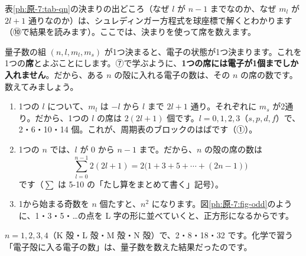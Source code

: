 \noindent 表\ref{ph:原-7:tab-qn}の決まりの出どころ（なぜ $l$ が $n-1$ までなのか、なぜ $m_l$ が $2l+1$ 通りなのか）は、シュレディンガー方程式を球座標で解くとわかります（⑩で結果を読みます）。ここでは、決まりを使って席を数えます。

量子数の組 $(n,l,m_l,m_s)$ が1つ決まると、電子の状態が1つ決まります。これを1つの\textbf{席}とよぶことにします。⑦で学ぶように、\textbf{1つの席には電子が1個までしか入れません}。だから、ある $n$ の殻に入れる電子の数は、その $n$ の席の数です。数えてみましょう。

\begin{enumerate}[label={\bkcircled{\arabic*}}, leftmargin=2.4\zw, itemsep=1pt, topsep=2pt]
\item 1つの $l$ について、$m_l$ は $-l$ から $l$ まで $2l+1$ 通り。それぞれに $m_s$ が2通り。だから、1つの $l$ の席は $2(2l+1)$ 個です。$l=0,1,2,3$（$s,p,d,f$）で、2・6・10・14 個。これが、周期表のブロックのはばです（①）。
\item 1つの $n$ では、$l$ が $0$ から $n-1$ まで。だから、$n$ の殻の席の数は
\[ \sum_{l=0}^{n-1}2(2l+1)=2\bigl(1+3+5+\cdots+(2n-1)\bigr) \]
です（$\sum$ は 5-10 の「たし算をまとめて書く」記号）。
\item 1から始まる奇数を $n$ 個たすと、$n^2$ になります。図\ref{ph:原-7:fig-odd}のように、1・3・5・…の点を L 字の形に並べていくと、正方形になるからです。
\end{enumerate}
\label{ph:原-7:2n2}$n=1,2,3,4$（K 殻・L 殻・M 殻・N 殻）で、2・8・18・32 です。化学で習う「電子殻に入る電子の数」は、量子数を数えた結果だったのです。


